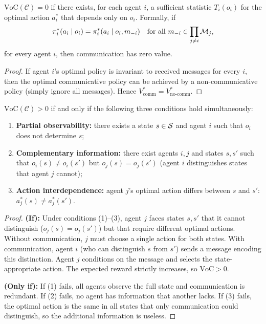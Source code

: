\documentclass[11pt,a4paper]{article}
\begin{document}
\begin{proposition}
\label{prop:voc-zero}
$\mathrm{VoC}(\mathcal{C}) = 0$ if there exists, for each
agent $i$, a sufficient statistic $T_i(o_i)$ for the optimal
action $a_i^*$ that depends only on $o_i$.  Formally, if
\[
  \pi_i^*(a_i \mid o_i) = \pi_i^*(a_i \mid o_i,
  m_{-i}) \quad \text{for all } m_{-i} \in \prod_{j \neq i}
  \mathcal{M}_j,
\]
for every agent $i$, then communication has zero value.
\end{proposition}

\begin{proof}
If agent $i$'s optimal policy is invariant to received messages
for every $i$, then the optimal communicative policy can be
achieved by a non-communicative policy (simply ignore all
messages).  Hence $V^*_{\mathrm{comm}} =
V^*_{\mathrm{no\text{-}comm}}$.
\end{proof}

\begin{proposition}
\label{prop:voc-positive}
$\mathrm{VoC}(\mathcal{C}) > 0$ if and only if the following
three conditions hold simultaneously:
\begin{enumerate}[nosep]
  \item \textbf{Partial observability:} there exists a state
    $s \in \mathcal{S}$ and agent $i$ such that $o_i$ does not
    determine $s$;
  \item \textbf{Complementary information:} there exist agents
    $i, j$ and states $s, s'$ such that $o_i(s) \neq o_i(s')$
    but $o_j(s) = o_j(s')$ (agent $i$ distinguishes states that
    agent $j$ cannot);
  \item \textbf{Action interdependence:} agent $j$'s optimal
    action differs between $s$ and $s'$:
    $a_j^*(s) \neq a_j^*(s')$.
\end{enumerate}
\end{proposition}

\begin{proof}
\textbf{(If):}  Under conditions (1)--(3), agent $j$ faces
states $s, s'$ that it cannot distinguish ($o_j(s) = o_j(s')$)
but that require different optimal actions.  Without
communication, $j$ must choose a single action for both states.
With communication, agent $i$ (who can distinguish $s$ from
$s'$) sends a message encoding this distinction.  Agent $j$
conditions on the message and selects the state-appropriate
action.  The expected reward strictly increases, so
$\mathrm{VoC} > 0$.

\textbf{(Only if):}  If (1) fails, all agents observe the full
state and communication is redundant.  If (2) fails, no agent
has information that another lacks.  If (3) fails, the optimal
action is the same in all states that only communication could
distinguish, so the additional information is useless.
\end{proof}
\end{document}
